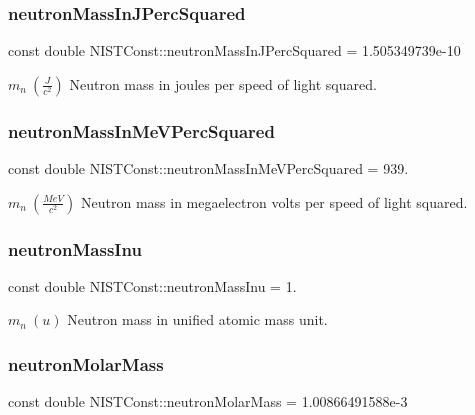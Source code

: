 \subsubsection{\texorpdfstring{neutron\+Mass\+In\+J\+Perc\+Squared}{neutronMassInJPercSquared}}
{\footnotesize\ttfamily const double N\+I\+S\+T\+Const\+::neutron\+Mass\+In\+J\+Perc\+Squared = 1.\+505349739e-\/10}

$m_n \ (\frac{J}{c^2})$ Neutron mass in joules per speed of light squared. \mbox{\label{group___n_i_s_t_const-_neutron_ga53f986a22e4dcb31cc8ed8151fd18a8e}} 
\subsubsection{\texorpdfstring{neutron\+Mass\+In\+Me\+V\+Perc\+Squared}{neutronMassInMeVPercSquared}}
{\footnotesize\ttfamily const double N\+I\+S\+T\+Const\+::neutron\+Mass\+In\+Me\+V\+Perc\+Squared = 939.}

$m_n \ (\frac{MeV}{c^2})$ Neutron mass in megaelectron volts per speed of light squared. \mbox{\label{group___n_i_s_t_const-_neutron_ga7931fb41eb5f1acf4b94d9d6b92ca4c3}} 
\subsubsection{\texorpdfstring{neutron\+Mass\+Inu}{neutronMassInu}}
{\footnotesize\ttfamily const double N\+I\+S\+T\+Const\+::neutron\+Mass\+Inu = 1.}

$m_n \ (u)$ Neutron mass in unified atomic mass unit. \mbox{\label{group___n_i_s_t_const-_neutron_ga0f7ab7fc272f54c17ecf777efff7003b}} 
\subsubsection{\texorpdfstring{neutron\+Molar\+Mass}{neutronMolarMass}}
{\footnotesize\ttfamily const double N\+I\+S\+T\+Const\+::neutron\+Molar\+Mass = 1.\+00866491588e-\/3}

